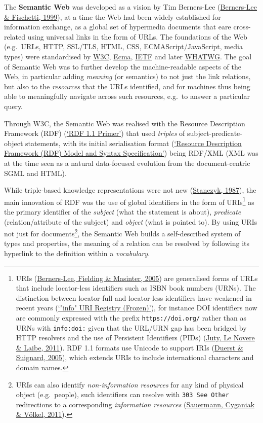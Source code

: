 The \textbf{Semantic Web} was developed as a vision by Tim Berners-Lee (\protect\hyperlink{ref-Guy7cjVY}{Berners-Lee \& Fischetti, 1999}), at a time the Web had been widely established for information exchange, as a global set of hypermedia documents that eare cross-related using universal links in the form of URLs. The foundations of the Web (e.g.~URLs, HTTP, SSL/TLS, HTML, CSS, ECMAScript/JavaScript, media types) were standardised by \href{https://www.w3.org/standards/}{W3C}, \href{https://www.ecma-international.org/}{Ecma}, \href{https://www.ietf.org/standards/}{IETF} and later \href{https://whatwg.org/}{WHATWG}. The goal of Semantic Web was to further develop the machine-readable aspects of the Web, in particular adding \emph{meaning} (or semantics) to not just the link relations, but also to the \emph{resources} that the URLs identified, and for machines thus being able to meaningfully navigate across such resources, e.g.~to answer a particular query.

Through W3C, the Semantic Web was realised with the Resource Description Framework (RDF) (\protect\hyperlink{ref-16WGmCih8}{{`RDF 1.1 Primer'}}) that used \emph{triples} of subject-predicate-object statements, with its initial serialisation format (\protect\hyperlink{ref-16wvFH4nh}{{`Resource Description Framework (RDF) Model and Syntax Specification'}}) being RDF/XML (XML was at the time seen as a natural data-focused evolution from the document-centric SGML and HTML).

While triple-based knowledge representations were not new (\protect\hyperlink{ref-NxvhwSmG}{Stanczyk, 1987}), the main innovation of RDF was the use of global identifiers in the form of URIs\footnote{URIs (\protect\hyperlink{ref-RRtwPF7Y}{Berners-Lee, Fielding \& Masinter, 2005}) are generalised forms of URLs that include locator-less identifiers
  such as ISBN book numbers (URNs). The distinction between locator-full and locator-less identifiers have weakened in recent years (\protect\hyperlink{ref-nW4HY8Nq}{{`"info" URI Registry (Frozen)'}}), for instance DOI identifiers now are commonly expressed with the prefix \texttt{https://doi.org/} rather than as URNs with \texttt{info:doi:} given that the URL/URN gap has been bridged by HTTP resolvers and the use of Persistent Identifiers (PIDs) (\protect\hyperlink{ref-HqZ3r6J3}{Juty, Le Novere \& Laibe, 2011}). RDF 1.1 formats use Unicode to support IRIs (\protect\hyperlink{ref-rqjuXkEf}{Duerst \& Suignard, 2005}), which extends URIs to include international characters and domain names.} as the primary identifier of the \emph{subject} (what the statement is about), \emph{predicate} (relation/attribute of the subject) and \emph{object} (what is pointed to). By using URIs not just for documents\footnote{URIs can also identify \emph{non-information resources} for any kind of physical object (e.g.~people), such identifiers can resolve with \texttt{303\ See\ Other} redirections to a corresponding \emph{information resources} (\protect\hyperlink{ref-rnzJ4khD}{Sauermann, Cyganiak \& Völkel, 2011}).}, the Semantic Web builds a self-described system of types and properties, the meaning of a relation can be resolved by following its hyperlink to the definition within a \emph{vocabulary}.

